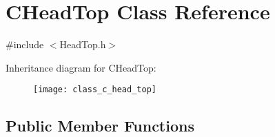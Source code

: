 \hypertarget{class_c_head_top}{\section{C\+Head\+Top Class Reference}
\label{class_c_head_top}
}


{\ttfamily \#include $<$Head\+Top.\+h$>$}

Inheritance diagram for C\+Head\+Top\+:\begin{figure}[H]
\begin{center}
\leavevmode
\texttt{[image: class\_c\_head\_top]}
\end{center}
\end{figure}
\subsection*{Public Member Functions}
